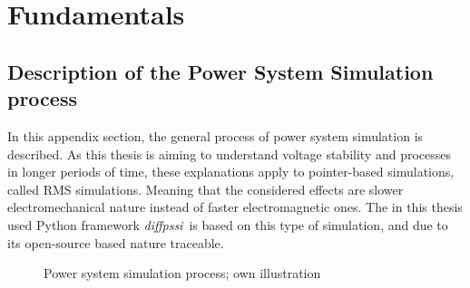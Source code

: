 
\label{app:appendix}


%  
%
%





\chapter{Fundamentals}

\section{Description of the Power System Simulation process}

In this appendix section, the general process of power system simulation is described. As this thesis is aiming to understand voltage stability and processes in longer periods of time, these explanations apply to pointer-based simulations, called RMS simulations. Meaning that the considered effects are slower electromechanical nature instead of faster electromagnetic ones. The in this thesis used Python framework \glqq \textit{diffpssi}\grqq~is based on this type of simulation, and due to its open-source based nature traceable.

\begin{figure}[htbp]
    \centering
    \caption{Power system simulation process; own illustration}
    \label{fig:power-system-simulation-process}
\end{figure}

